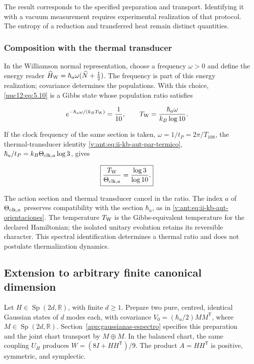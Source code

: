 The result corresponds to the specified preparation and transport. Identifying it with a vacuum measurement requires experimental realization of that protocol. The entropy of a reduction and transferred heat remain distinct quantities.

\subsubsection{Composition with the thermal transducer}

In the Williamson normal representation, choose a frequency \(\omega>0\) and define the energy reader \(\widehat H_{\rm W}=\hbar_a\omega(\widehat N+\tfrac12)\). The frequency is part of this energy realization; covariance determines the populations. With this choice, \eqref{nuc12:eq:5.10} is a Gibbs state whose population ratio satisfies

\[
e^{-\hbar_a\omega/(k_BT_{\rm W})}=\frac1{10},\qquad
T_{\rm W}=\frac{\hbar_a\omega}{k_B\log10}.
\]

If the clock frequency of the same section is taken, \(\omega=1/t_P=2\pi/T_{108}\), the thermal-transducer identity \eqref{v:ant:eq:ii-kb-aut-par-termico}, \(\hbar_a/t_P=k_B\Theta_{{\rm clk},a}\log3\), gives

\begin{equation}
\boxed{\frac{T_{\rm W}}{\Theta_{{\rm clk},a}}=\frac{\log3}{\log10}.}
\label{nuc12:eq:5.11}
\end{equation}

The action section and thermal transducer cancel in the ratio. The index \(a\) of \(\Theta_{{\rm clk},a}\) preserves compatibility with the section \(\hbar_a\), as in \eqref{v:ant:eq:ii-kb-aut-orientaciones}. The temperature \(T_{\rm W}\) is the Gibbs-equivalent temperature for the declared Hamiltonian; the isolated unitary evolution retains its reversible character. This spectral identification determines a thermal ratio and does not postulate thermalization dynamics.

\subsection{Extension to arbitrary finite canonical dimension}

Let \(H\in\operatorname{Sp}(2d,\mathbb R)\), with finite \(d\geq1\). Prepare two pure, centred, identical Gaussian states of \(d\) modes each, with covariance \(V_0=(\hbar_a/2)MM^{\mathsf T}\), where \(M\in\operatorname{Sp}(2d,\mathbb R)\). Section~\ref{app:gaussianas-espectro} specifies this preparation and the joint chart transport by \(M\oplus M\). In the balanced chart, the same coupling \(U_H\) produces \(W=(8I+HH^{\mathsf T})/9\). The product \(A=HH^{\mathsf T}\) is positive, symmetric, and symplectic.

